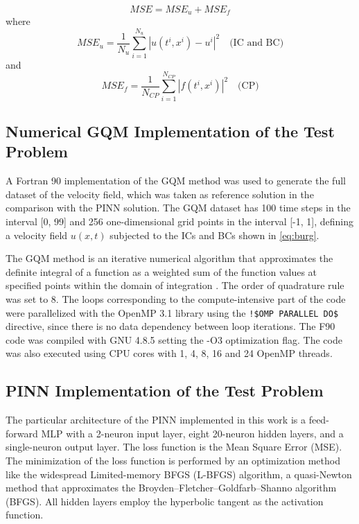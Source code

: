 \documentclass[conference]{IEEEtran}
\begin{document}
\begin{equation}\label{eq:mse}
MSE = MSE_u + MSE_f
\end{equation}
where
$$ MSE_u = \frac{1}{N_u}\sum_{i=1}^{N_u}|u(t^i, x^i)-u^i|^2  \quad \text{(IC and BC)}$$
and
$$ MSE_f = \frac{1}{N_{CP}}\sum_{i=1}^{N_{CP}}|f(t^i, x^i)|^2  \quad \text{(CP)}$$

\subsection{Numerical GQM Implementation of the Test Problem}

A Fortran 90 implementation of the GQM method was used to generate the full dataset of the velocity field, which was taken as reference solution in the comparison with the PINN solution.
 The GQM dataset has 100 time steps in the interval [0, 99] and 256 one-dimensional grid points in the interval [-1, 1], defining a velocity field $u(x,t)$ subjected to the ICs and BCs shown in \autoref {eq:burg}. 

The GQM method is an iterative numerical algorithm that approximates the definite integral of a function as a weighted sum of the function values at specified points within the domain of integration \cite{Burkardt2013}. The order of quadrature rule was set to 8. The loops corresponding to the compute-intensive part of the code were parallelized with the OpenMP 3.1 library using the \lstinline{!$OMP PARALLEL DO$} directive, since there is no data dependency between loop iterations. The F90 code was compiled with GNU 4.8.5 setting the -O3 optimization flag. The code was also executed using CPU cores with 1, 4, 8, 16 and 24 OpenMP threads.   

\subsection{PINN Implementation of the Test Problem}

The particular architecture of the PINN implemented in this work is a feed-forward MLP with a 2-neuron input layer, eight 20-neuron hidden layers, and a single-neuron output layer. The loss function is the Mean Square Error (MSE). The minimization of the loss function is performed by an optimization method like the widespread Limited-memory BFGS (L-BFGS) algorithm, a quasi-Newton method that approximates the Broyden–Fletcher–Goldfarb–Shanno algorithm (BFGS). All hidden layers employ the hyperbolic tangent as the activation function.
\end{document}
